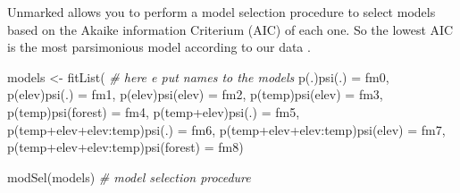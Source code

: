 \documentclass[
]{book}
\newenvironment{Shaded}{\begin{snugshade}}{\end{snugshade}}
\newcommand{\CommentTok}[1]{\textcolor[rgb]{0.56,0.35,0.01}{\textit{#1}}}
\newcommand{\FunctionTok}[1]{\textcolor[rgb]{0.00,0.00,0.00}{#1}}
\newcommand{\NormalTok}[1]{#1}
\newcommand{\OtherTok}[1]{\textcolor[rgb]{0.56,0.35,0.01}{#1}}
\newcommand{\StringTok}[1]{\textcolor[rgb]{0.31,0.60,0.02}{#1}}
\begin{document}
Unmarked allows you to perform a model selection procedure to select models based on the Akaike information Criterium (AIC) of each one. So the lowest AIC is the most parsimonious model according to our data \citep{Burnham2004}.

\begin{Shaded}
\begin{Highlighting}[]
\NormalTok{models }\OtherTok{\textless{}{-}} \FunctionTok{fitList}\NormalTok{( }\CommentTok{\# here e put names to the models}
  \StringTok{\textquotesingle{}p(.)psi(.)\textquotesingle{}}                        \OtherTok{=}\NormalTok{ fm0,}
  \StringTok{\textquotesingle{}p(elev)psi(.)\textquotesingle{}}                     \OtherTok{=}\NormalTok{ fm1,}
  \StringTok{\textquotesingle{}p(elev)psi(elev)\textquotesingle{}}                  \OtherTok{=}\NormalTok{ fm2,}
  \StringTok{\textquotesingle{}p(temp)psi(elev)\textquotesingle{}}                  \OtherTok{=}\NormalTok{ fm3,}
  \StringTok{\textquotesingle{}p(temp)psi(forest)\textquotesingle{}}                \OtherTok{=}\NormalTok{ fm4,}
  \StringTok{\textquotesingle{}p(temp+elev)psi(.)\textquotesingle{}}                \OtherTok{=}\NormalTok{ fm5,}
  \StringTok{\textquotesingle{}p(temp+elev+elev:temp)psi(.)\textquotesingle{}}      \OtherTok{=}\NormalTok{ fm6,}
  \StringTok{\textquotesingle{}p(temp+elev+elev:temp)psi(elev)\textquotesingle{}}   \OtherTok{=}\NormalTok{ fm7,}
  \StringTok{\textquotesingle{}p(temp+elev+elev:temp)psi(forest)\textquotesingle{}} \OtherTok{=}\NormalTok{ fm8)}

\FunctionTok{modSel}\NormalTok{(models) }\CommentTok{\# model selection procedure}
\end{Highlighting}
\end{Shaded}
\end{document}
